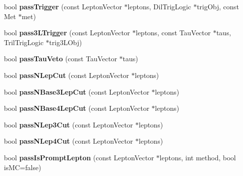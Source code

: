 \begin{DoxyCompactItemize}
\item 
\hypertarget{classSusySelection_a590f5edfb2d7ec0ef3c25fcd1ce12c12}{
bool {\bfseries passTrigger} (const LeptonVector $\ast$leptons, DilTrigLogic $\ast$trigObj, const Met $\ast$met)}
\label{classSusySelection_a590f5edfb2d7ec0ef3c25fcd1ce12c12}

\item 
\hypertarget{classSusySelection_a19864d6bf1229f015d9e01593d478671}{
bool {\bfseries pass3LTrigger} (const LeptonVector $\ast$leptons, const TauVector $\ast$taus, TrilTrigLogic $\ast$trig3LObj)}
\label{classSusySelection_a19864d6bf1229f015d9e01593d478671}

\item 
\hypertarget{classSusySelection_a80ade4cf204b7599c09d706c027c7870}{
bool {\bfseries passTauVeto} (const TauVector $\ast$taus)}
\label{classSusySelection_a80ade4cf204b7599c09d706c027c7870}

\item 
\hypertarget{classSusySelection_a20f0111e9bb7d42b3d29fadad89704fc}{
bool {\bfseries passNLepCut} (const LeptonVector $\ast$leptons)}
\label{classSusySelection_a20f0111e9bb7d42b3d29fadad89704fc}

\item 
\hypertarget{classSusySelection_a9fd596d0bea0c19e7f01ec6e65000557}{
bool {\bfseries passNBase3LepCut} (const LeptonVector $\ast$leptons)}
\label{classSusySelection_a9fd596d0bea0c19e7f01ec6e65000557}

\item 
\hypertarget{classSusySelection_a548e38ba694d805031ec047a1031774b}{
bool {\bfseries passNBase4LepCut} (const LeptonVector $\ast$leptons)}
\label{classSusySelection_a548e38ba694d805031ec047a1031774b}

\item 
\hypertarget{classSusySelection_ae7013aa2c4be94858563c091ddc241dc}{
bool {\bfseries passNLep3Cut} (const LeptonVector $\ast$leptons)}
\label{classSusySelection_ae7013aa2c4be94858563c091ddc241dc}

\item 
\hypertarget{classSusySelection_a81d375efbb5d32d3f59d5f5071381d4b}{
bool {\bfseries passNLep4Cut} (const LeptonVector $\ast$leptons)}
\label{classSusySelection_a81d375efbb5d32d3f59d5f5071381d4b}

\item 
\hypertarget{classSusySelection_a67c9df2902272cc7375d6317197cfb0d}{
bool {\bfseries passIsPromptLepton} (const LeptonVector $\ast$leptons, int method, bool isMC=false)}
\label{classSusySelection_a67c9df2902272cc7375d6317197cfb0d}


\end{DoxyCompactItemize}
